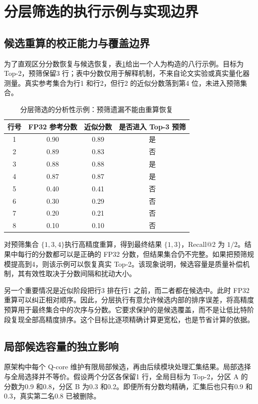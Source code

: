 \section{分层筛选的执行示例与实现边界}
\subsection{候选重算的校正能力与覆盖边界}
为了直观区分分数恢复与候选恢复，表\ref{tab:acc-toy}给出一个人为构造的八行示例。目标为 Top-2，预筛保留3 行；表中分数仅用于解释机制，不来自论文实验或真实量化器测量。真实参考集合为行1 和行2，但行2 的近似分数落到第4 位，未进入预筛集合。

\begin{table}[htbp]\centering\caption{分层筛选的分析性示例：预筛遗漏不能由重算恢复}\label{tab:acc-toy}
\begin{tabular}{cccc}\toprule
行号&FP32 参考分数&近似分数&是否进入 Top-3 预筛\\\midrule
1&0.90&0.89&是\\
2&0.89&0.83&否\\
3&0.88&0.88&是\\
4&0.87&0.87&是\\
5&0.40&0.41&否\\
6&0.30&0.29&否\\
7&0.20&0.21&否\\
8&0.10&0.10&否\\\bottomrule
\end{tabular}\end{table}

对预筛集合 $\{1,3,4\}$执行高精度重算，得到最终结果 $\{1,3\}$，Recall@2 为 $1/2$。结果中每行的分数都可以是正确的 FP32 分数，但结果集合仍不完整。如果把预筛规模提高到4，则该示例可以恢复真实 Top-2。该现象说明，候选容量是质量补偿机制，其有效性取决于分数间隔和扰动大小。

另一个重要情况是近似阶段把行3 排在行1 之前，而二者都在候选中。此时 FP32 重算可以纠正相对顺序。因此，分层执行有意允许候选内部的排序误差，将高精度预算用于最终集合中的次序与分数。它要求保护的是候选覆盖，而不是让低比特阶段复现全部高精度排序。这个目标比逐项精确计算更宽松，也是节省计算的依据。

\subsection{局部候选容量的独立影响}
原架构中每个 Q-core 维护有限局部候选，再由后续模块处理汇集结果。局部选择与全局选择并不等价。假设两个分区各保留1 行，全局目标为 Top-2，分区 A 的分数为0.9 和0.8，分区 B 为0.3 和0.2。即便所有分数均精确，汇集后也只有0.9 和0.3，真实第二名0.8 已被删除。

